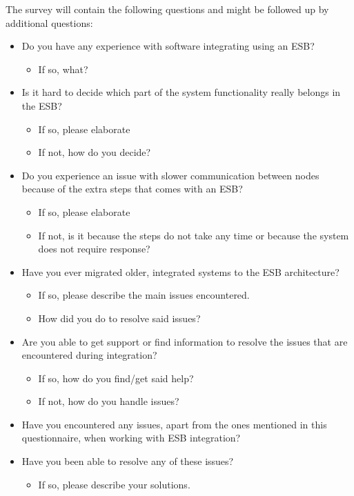 \documentclass{llncs}
\begin{document}
The survey will contain the following questions and might be followed up by additional questions:
\label{survey}
\begin{itemize}

\item Do you have any experience with software integrating using an ESB?
\begin{itemize}
\item If so, what?
\end{itemize}

\item Is it hard to decide which part of the system functionality really belongs in the ESB?%
\begin{itemize}
\item If so, please elaborate
\item If not, how do you decide?
\end{itemize}

\item Do you experience an issue with slower communication between nodes because of the extra steps that comes with an ESB?
\begin{itemize}
\item If so, please elaborate
\item If not, is it because the steps do not take any time or because the system does not require response?
\end{itemize}

\item Have you ever migrated older, integrated systems to the ESB architecture?
\begin{itemize}
\item If so, please describe the main issues encountered.
\item How did you do to resolve said issues?
\end{itemize}

\item Are you able to get support or find information to resolve the issues that are encountered during integration?
\begin{itemize}
\item If so, how do you find/get said help?
\item If not, how do you handle issues?
\end{itemize}

\item Have you encountered any issues, apart from the ones mentioned in this questionnaire, when working with ESB integration?

\item Have you been able to resolve any of these issues?
\begin{itemize}
\item If so, please describe your solutions.
\end{itemize}

\end{itemize}
\end{document}

